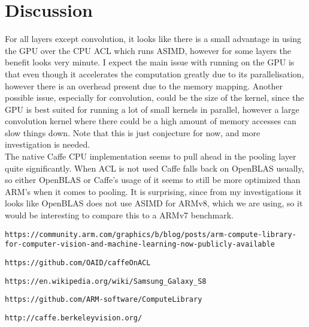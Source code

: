 \documentclass[12pt, a4paper, notitlepage]{report}
\begin{document}
\section*{Discussion}
For all layers except convolution, it looks like there is a small advantage in using the GPU over the CPU ACL which runs ASIMD, however for some layers the benefit looks very minute. I expect the main issue with running on the GPU is that even though it accelerates the computation greatly due to its parallelisation, however there is an overhead present due to the memory mapping. Another possible issue, especially for convolution, could be the size of the kernel, since the GPU is best suited for running a lot of small kernels in parallel, however a large convolution kernel where there could be a high amount of memory accesses can slow things down. Note that this is just conjecture for now, and more investigation is needed.\\
The native Caffe CPU implementation seems to pull ahead in the pooling layer quite significantly. When ACL is not used Caffe falls back on OpenBLAS usually, so either OpenBLAS or Caffe's usage of it seems to still be more optimized than ARM's when it comes to pooling. It is surprising, since from my investigations it looks like OpenBLAS does not use ASIMD for ARMv8, which we are using, so it would be interesting to compare this to a ARMv7 benchmark.

\medskip

\begin{thebibliography}{9}

\begin{lstlisting}[breaklines,basicstyle=\ttfamily]
https://community.arm.com/graphics/b/blog/posts/arm-compute-library-for-computer-vision-and-machine-learning-now-publicly-available
\end{lstlisting}

\texttt{https://github.com/OAID/caffeOnACL}

\texttt{https://en.wikipedia.org/wiki/Samsung\_Galaxy\_S8}

\texttt{https://github.com/ARM-software/ComputeLibrary}

\texttt{http://caffe.berkeleyvision.org/}

\end{thebibliography}
\end{document}
